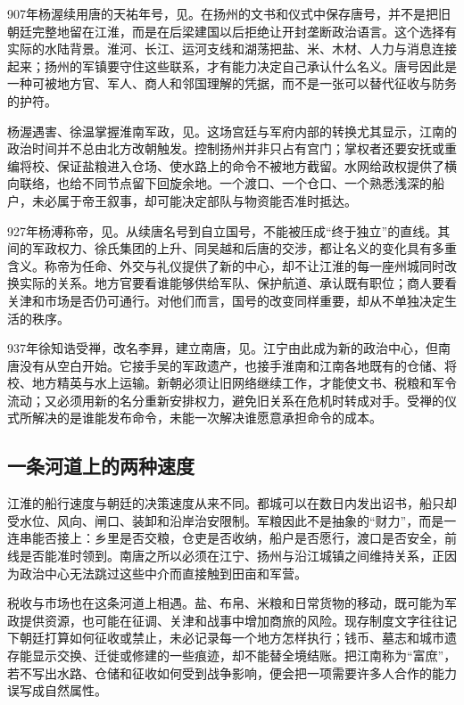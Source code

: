 907年杨渥续用唐的天祐年号，见。在扬州的文书和仪式中保存唐号，并不是把旧朝廷完整地留在江淮，而是在后梁建国以后拒绝让开封垄断政治语言。这个选择有实际的水陆背景。淮河、长江、运河支线和湖荡把盐、米、木材、人力与消息连接起来；扬州的军镇要守住这些联系，才有能力决定自己承认什么名义。唐号因此是一种可被地方官、军人、商人和邻国理解的凭据，而不是一张可以替代征收与防务的护符。

杨渥遇害、徐温掌握淮南军政，见。这场宫廷与军府内部的转换尤其显示，江南的政治时间并不总由北方改朝触发。控制扬州并非只占有宫门；掌权者还要安抚或重编将校、保证盐粮进入仓场、使水路上的命令不被地方截留。水网给政权提供了横向联络，也给不同节点留下回旋余地。一个渡口、一个仓口、一个熟悉浅深的船户，未必属于帝王叙事，却可能决定部队与物资能否准时抵达。

927年杨溥称帝，见。从续唐名号到自立国号，不能被压成“终于独立”的直线。其间的军政权力、徐氏集团的上升、同吴越和后唐的交涉，都让名义的变化具有多重含义。称帝为任命、外交与礼仪提供了新的中心，却不让江淮的每一座州城同时改换实际的关系。地方官要看谁能够供给军队、保护航道、承认既有职位；商人要看关津和市场是否仍可通行。对他们而言，国号的改变同样重要，却从不单独决定生活的秩序。

937年徐知诰受禅，改名李昪，建立南唐，见。江宁由此成为新的政治中心，但南唐没有从空白开始。它接手吴的军政遗产，也接手淮南和江南各地既有的仓储、将校、地方精英与水上运输。新朝必须让旧网络继续工作，才能使文书、税粮和军令流动；又必须用新的名分重新安排权力，避免旧关系在危机时转成对手。受禅的仪式所解决的是谁能发布命令，未能一次解决谁愿意承担命令的成本。

\subsection{一条河道上的两种速度}

江淮的船行速度与朝廷的决策速度从来不同。都城可以在数日内发出诏书，船只却受水位、风向、闸口、装卸和沿岸治安限制。军粮因此不是抽象的“财力”，而是一连串能否接上：乡里是否交粮，仓吏是否收纳，船户是否愿行，渡口是否安全，前线是否能准时领到。南唐之所以必须在江宁、扬州与沿江城镇之间维持关系，正因为政治中心无法跳过这些中介而直接触到田亩和军营。

税收与市场也在这条河道上相遇。盐、布帛、米粮和日常货物的移动，既可能为军政提供资源，也可能在征调、关津和战事中增加商旅的风险。现存制度文字往往记下朝廷打算如何征收或禁止，未必记录每一个地方怎样执行；钱币、墓志和城市遗存能显示交换、迁徙或修建的一些痕迹，却不能替全境结账。把江南称为“富庶”，若不写出水路、仓储和征收如何受到战争影响，便会把一项需要许多人合作的能力误写成自然属性。

